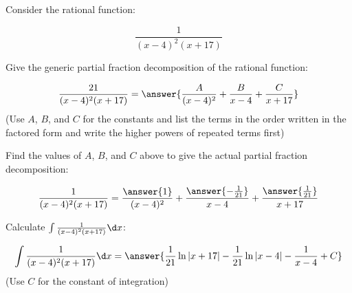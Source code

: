 \documentclass{ximera}
\author{Nicholas Hemleben and Jim Talamo}
\begin{document}
\begin{exercise}


Consider the rational function:

\[ 
\frac{1}{(x-4)^2(x+17)} 
\]

Give the generic partial fraction decomposition of the rational function:

\[
\frac{21}{(x-4)^2(x+17)} =
\answer{\frac{A}{(x-4)^2} + \frac{B}{x-4} + \frac{C}{x+17}}
\]
(Use $A$, $B$, and $C$ for the constants and list the terms in the order written in the factored form and write the higher powers of repeated terms first)

\begin{exercise}
Find the values of $A$, $B$, and $C$ above to give the actual partial fraction decomposition:

\[
\frac{1}{(x-4)^2(x+17)} =
 \frac{\answer{1}}{{(x-4)^2}} + 
\frac{\answer{-\frac{1}{21}}}{{x-4}} +
 \frac{\answer{\frac{1}{21}}}{{x+17}}
\]
\end{exercise}

\begin{exercise}
Calculate $\int \frac{1}{(x-4)^2(x+17)} \d x $:

\[ 
\int \frac{1}{(x-4)^2(x+17)} \d x = \answer{\frac{1}{21} \ln|x+17|-\frac{1}{21}\ln|x-4|-\frac{1}{x-4}+C}
\]
(Use $C$ for the constant of integration)

\end{exercise}
\end{exercise}
\end{document}
